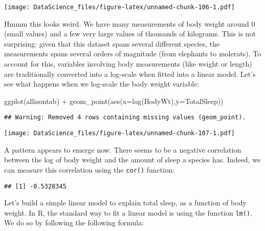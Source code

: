 \documentclass[
]{book}
\newenvironment{Shaded}{\begin{snugshade}}{\end{snugshade}}
\newcommand{\AttributeTok}[1]{\textcolor[rgb]{0.77,0.63,0.00}{#1}}
\newcommand{\FunctionTok}[1]{\textcolor[rgb]{0.00,0.00,0.00}{#1}}
\newcommand{\NormalTok}[1]{#1}
\newcommand{\SpecialCharTok}[1]{\textcolor[rgb]{0.00,0.00,0.00}{#1}}
\newcommand{\StringTok}[1]{\textcolor[rgb]{0.31,0.60,0.02}{#1}}
\begin{document}
\texttt{[image: DataScience\_files/figure-latex/unnamed-chunk-106-1.pdf]}

Hmmm this looks weird. We have many measurements of body weight around 0 (small values) and a few very large values of thousands of kilograms. This is not surprising: given that this dataset spans several different species, the measurements spans several orders of magnitude (from elephants to molerats). To account for this, variables involving body measurements (like weight or length) are traditionally converted into a log-scale when fitted into a linear model. Let's see what happens when we log-scale the body weight variable:

\begin{Shaded}
\begin{Highlighting}[]
\FunctionTok{ggplot}\NormalTok{(allisontab) }\SpecialCharTok{+} \FunctionTok{geom\_point}\NormalTok{(}\FunctionTok{aes}\NormalTok{(}\AttributeTok{x=}\FunctionTok{log}\NormalTok{(BodyWt),}\AttributeTok{y=}\NormalTok{TotalSleep))}
\end{Highlighting}
\end{Shaded}

\begin{verbatim}
## Warning: Removed 4 rows containing missing values (geom_point).
\end{verbatim}

\texttt{[image: DataScience\_files/figure-latex/unnamed-chunk-107-1.pdf]}

A pattern appears to emerge now. There seems to be a negative correlation between the log of body weight and the amount of sleep a species has. Indeed, we can measure this correlation using the \texttt{cor()} function:

\begin{Shaded}
\end{Shaded}

\begin{verbatim}
## [1] -0.5328345
\end{verbatim}

Let's build a simple linear model to explain total sleep, as a function of body weight. In R, the standard way to fit a linear model is using the function \texttt{lm()}. We do so by following the following formula:
\end{document}
